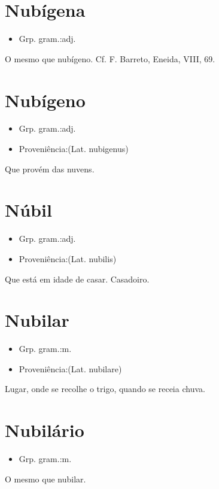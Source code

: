 \section{Nubígena}
\begin{itemize}
\item {Grp. gram.:adj.}
\end{itemize}
O mesmo que \textunderscore nubígeno\textunderscore . Cf. F. Barreto, \textunderscore Eneida\textunderscore , VIII, 69.
\section{Nubígeno}
\begin{itemize}
\item {Grp. gram.:adj.}
\end{itemize}
\begin{itemize}
\item {Proveniência:(Lat. \textunderscore nubigenus\textunderscore )}
\end{itemize}
Que provém das nuvens.
\section{Núbil}
\begin{itemize}
\item {Grp. gram.:adj.}
\end{itemize}
\begin{itemize}
\item {Proveniência:(Lat. \textunderscore nubilis\textunderscore )}
\end{itemize}
Que está em idade de casar.
Casadoiro.
\section{Nubilar}
\begin{itemize}
\item {Grp. gram.:m.}
\end{itemize}
\begin{itemize}
\item {Proveniência:(Lat. \textunderscore nubilare\textunderscore )}
\end{itemize}
Lugar, onde se recolhe o trigo, quando se receia chuva.
\section{Nubilário}
\begin{itemize}
\item {Grp. gram.:m.}
\end{itemize}
O mesmo que \textunderscore nubilar\textunderscore .

